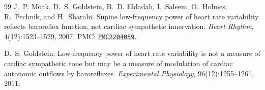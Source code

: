 \documentclass[12pt,a4paper]{article}
\begin{document}
\begin{thebibliography}{99}
J.~P. Moak, D.~S. Goldstein, B.~D. Eldadah, I.~Saleem, O.~Holmes,
R.~Pechnik, and H.~Sharabi.
Supine low-frequency power of heart rate variability reflects baroreflex
function, not cardiac sympathetic innervation.
\textit{Heart Rhythm}, 4(12):1523--1529, 2007.
PMC: \href{https://pmc.ncbi.nlm.nih.gov/articles/PMC2204059/}{\texttt{PMC2204059}}.

D.~S. Goldstein.
Low-frequency power of heart rate variability is not a measure of cardiac
sympathetic tone but may be a measure of modulation of cardiac autonomic
outflows by baroreflexes.
\textit{Experimental Physiology}, 96(12):1255--1261, 2011.

\end{thebibliography}
\end{document}
